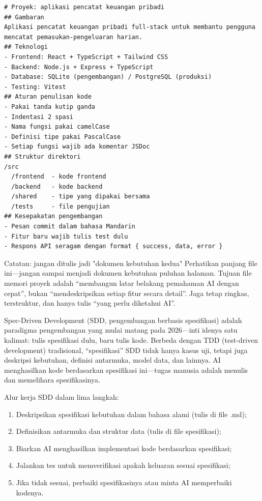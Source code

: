 \begin{lstlisting}
# Proyek: aplikasi pencatat keuangan pribadi
## Gambaran
Aplikasi pencatat keuangan pribadi full-stack untuk membantu pengguna mencatat pemasukan-pengeluaran harian.
## Teknologi
- Frontend: React + TypeScript + Tailwind CSS
- Backend: Node.js + Express + TypeScript
- Database: SQLite (pengembangan) / PostgreSQL (produksi)
- Testing: Vitest
## Aturan penulisan kode
- Pakai tanda kutip ganda
- Indentasi 2 spasi
- Nama fungsi pakai camelCase
- Definisi tipe pakai PascalCase
- Setiap fungsi wajib ada komentar JSDoc
## Struktur direktori
/src
  /frontend  - kode frontend
  /backend   - kode backend
  /shared    - tipe yang dipakai bersama
  /tests     - file pengujian
## Kesepakatan pengembangan
- Pesan commit dalam bahasa Mandarin
- Fitur baru wajib tulis test dulu
- Respons API seragam dengan format { success, data, error }
\end{lstlisting}

\begin{tcbwarn}{Catatan: jangan ditulis jadi "dokumen kebutuhan kedua"}
Perhatikan panjang file ini—jangan sampai menjadi dokumen kebutuhan puluhan halaman. Tujuan file memori proyek adalah “membangun latar belakang pemahaman AI dengan cepat”, bukan “mendeskripsikan setiap fitur secara detail”. Jaga tetap ringkas, terstruktur, dan hanya tulis “yang perlu diketahui AI”.

\end{tcbwarn}


Spec-Driven Development (SDD, pengembangan berbasis spesifikasi) adalah paradigma pengembangan yang mulai matang pada 2026—inti idenya satu kalimat: tulis spesifikasi dulu, baru tulis kode. Berbeda dengan TDD (test-driven development) tradisional, “spesifikasi” SDD tidak hanya kasus uji, tetapi juga deskripsi kebutuhan, definisi antarmuka, model data, dan lainnya. AI menghasilkan kode berdasarkan spesifikasi ini—tugas manusia adalah menulis dan memelihara spesifikasinya.

Alur kerja SDD dalam lima langkah:

\begin{enumerate}
  \item Deskripsikan spesifikasi kebutuhan dalam bahasa alami (tulis di file .md);
  \item Definisikan antarmuka dan struktur data (tulis di file spesifikasi);
  \item Biarkan AI menghasilkan implementasi kode berdasarkan spesifikasi;
  \item Jalankan tes untuk memverifikasi apakah keluaran sesuai spesifikasi;
  \item Jika tidak sesuai, perbaiki spesifikasinya atau minta AI memperbaiki kodenya.
\end{enumerate}

